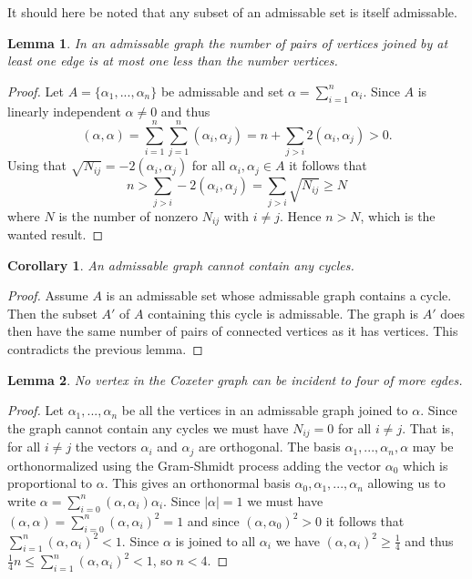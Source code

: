 \documentclass[twoside,utf8]{article}
\theoremstyle{plain}
\newtheorem{lemma}{Lemma}
\newtheorem*{corollary}{Corollary}
\theoremstyle{definition}
\theoremstyle{remark}
\begin{document}
It should here be noted that any subset of an admissable set is itself admissable. 


\begin{lemma} \label{lemma:VertexMoreThanEdge}
In an admissable graph the number of pairs of vertices joined by at least one edge is at most one less than the number vertices.
\end{lemma}
\begin{proof}
Let $A=\{\alpha_1,...,\alpha_n\}$ be admissable and set $\alpha = \sum_{i=1}^n \alpha_i$. Since $A$ is linearly independent $\alpha \neq 0$ and thus 
\[
(\alpha,\alpha) = \sum_{i=1}^n \sum_{j=1}^n (\alpha_i,\alpha_j) = n + \sum_{j>i} 2(\alpha_i,\alpha_j) > 0.
\]
Using that $\sqrt{N_{ij}}=-2(\alpha_i,\alpha_j)$ for all $\alpha_i,\alpha_j\in A$ it follows that
\[
n > \sum_{j>i} -2(\alpha_i,\alpha_j) = \sum_{j>i} \sqrt{ N_{ij} } \geq N
\]
where $N$ is the number of nonzero $N_{ij}$ with $i\neq j$. Hence $n>N$, which is the wanted result.
\end{proof}

\begin{corollary}
An admissable graph cannot contain any cycles. 
\end{corollary}
\begin{proof}
Assume $A$ is an admissable set whose admissable graph contains a cycle. Then the subset $A'$ of $A$ containing this cycle is admissable. The graph is $A'$ does then have the same number of pairs of connected vertices as it has vertices. This contradicts the previous lemma.
\end{proof}



\begin{lemma} \label{lemma:NoMoreThanThree}
No vertex in the Coxeter graph can be incident to four of more egdes. 
\end{lemma}
\begin{proof}
Let $\alpha_1,...,\alpha_n$ be all the vertices in an admissable graph joined to $\alpha$. Since the graph cannot contain any cycles we must have $N_{ij}=0$ for all $i\neq j$. That is, for all $i\neq j$ the vectors $\alpha_i$ and $\alpha_j$ are orthogonal. The basis $\alpha_1,...,\alpha_n,\alpha$ may be orthonormalized using the Gram-Shmidt process adding the vector $\alpha_0$ which is proportional to $\alpha$. This gives an orthonormal basis $\alpha_0,\alpha_1,...,\alpha_n$ allowing us to write $\alpha = \sum_{i=0}^n (\alpha,\alpha_i)\alpha_i$. Since $|\alpha|=1$ we must have $(\alpha,\alpha) = \sum_{i=0}^n (\alpha,\alpha_i)^2 = 1$ and since $(\alpha,\alpha_0)^2>0$ it follows that $\sum_{i=1}^n (\alpha,\alpha_i)^2 < 1$.
Since $\alpha$ is joined to all $\alpha_i$ we have $(\alpha,\alpha_i)^2 \geq \frac{1}{4}$ and thus $\frac{1}{4}n \leq \sum_{i=1}^n (\alpha,\alpha_i)^2 < 1$, so $n<4$.
\end{proof}
\end{document}
